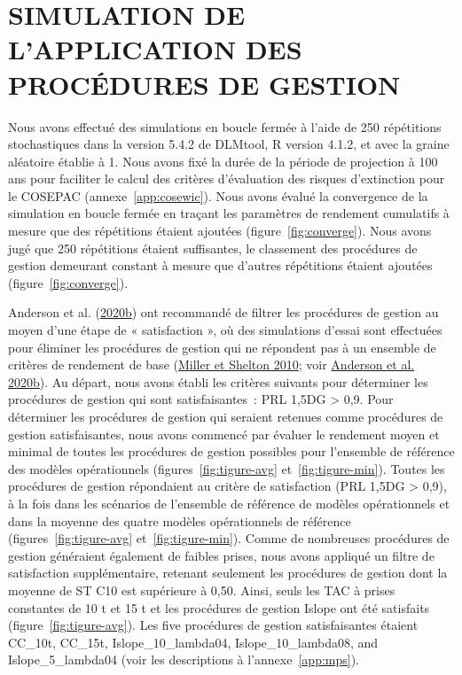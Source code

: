 \documentclass[french,11pt]{book}
\begin{document}
\hypertarget{sec:simulation}{%
\section{SIMULATION DE L'APPLICATION DES PROCÉDURES DE GESTION}\label{sec:simulation}}

Nous avons effectué des simulations en boucle fermée à l'aide de 250 répétitions stochastiques dans la version 5.4.2 de DLMtool, R version 4.1.2, et avec la graine aléatoire établie à 1. Nous avons fixé la durée de la période de projection à 100 ans pour faciliter le calcul des critères d'évaluation des risques d'extinction pour le COSEPAC (annexe~\ref{app:cosewic}). Nous avons évalué la convergence de la simulation en boucle fermée en traçant les paramètres de rendement cumulatifs à mesure que des répétitions étaient ajoutées (figure~\ref{fig:converge}). Nous avons jugé que 250 répétitions étaient suffisantes, le classement des procédures de gestion demeurant constant à mesure que d'autres répétitions étaient ajoutées (figure~\ref{fig:converge}).

Anderson et al. (\protect\hyperlink{ref-anderson2020gfmp}{2020b}) ont recommandé de filtrer les procédures de gestion au moyen d'une étape de « satisfaction », où des simulations d'essai sont effectuées pour éliminer les procédures de gestion qui ne répondent pas à un ensemble de critères de rendement de base (\protect\hyperlink{ref-miller2010}{Miller et Shelton 2010}; voir \protect\hyperlink{ref-anderson2020gfmp}{Anderson et al. 2020b}). Au départ, nous avons établi les critères suivants pour déterminer les procédures de gestion qui sont satisfaisantes~: PRL 1,5DG \textgreater{} 0,9. Pour déterminer les procédures de gestion qui seraient retenues comme procédures de gestion satisfaisantes, nous avons commencé par évaluer le rendement moyen et minimal de toutes les procédures de gestion possibles pour l'ensemble de référence des modèles opérationnels (figures~\ref{fig:tigure-avg} et~\ref{fig:tigure-min}). Toutes les procédures de gestion répondaient au critère de satisfaction (PRL 1,5DG \textgreater{} 0,9), à la fois dans les scénarios de l'ensemble de référence de modèles opérationnels et dans la moyenne des quatre modèles opérationnels de référence (figures~\ref{fig:tigure-avg} et~\ref{fig:tigure-min}). Comme de nombreuses procédures de gestion généraient également de faibles prises, nous avons appliqué un filtre de satisfaction supplémentaire, retenant seulement les procédures de gestion dont la moyenne de ST C10 est supérieure à 0,50. Ainsi, seuls les TAC à prises constantes de 10 t et 15 t et les procédures de gestion Islope ont été satisfaits (figure~\ref{fig:tigure-avg}). Les five procédures de gestion satisfaisantes étaient CC\_10t, CC\_15t, Islope\_10\_lambda04, Islope\_10\_lambda08, and Islope\_5\_lambda04 (voir les descriptions à l'annexe~\ref{app:mps}).
\end{document}

